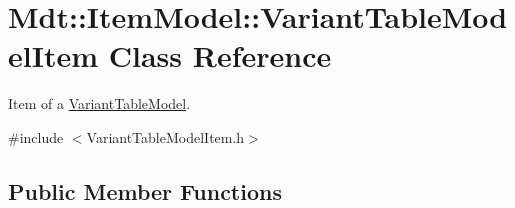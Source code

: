 \hypertarget{class_mdt_1_1_item_model_1_1_variant_table_model_item}{}\section{Mdt\+:\+:Item\+Model\+:\+:Variant\+Table\+Model\+Item Class Reference}
\label{class_mdt_1_1_item_model_1_1_variant_table_model_item}


Item of a \hyperlink{class_mdt_1_1_item_model_1_1_variant_table_model}{Variant\+Table\+Model}.  




{\ttfamily \#include $<$Variant\+Table\+Model\+Item.\+h$>$}

\subsection*{Public Member Functions}
